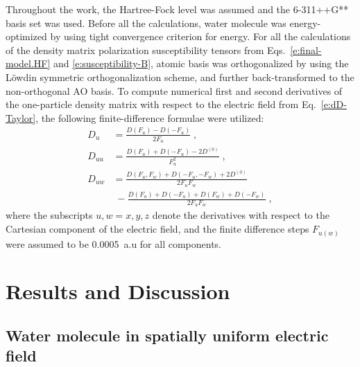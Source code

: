 \documentclass[aip,amsmath,amssymb,reprint,floatfix]{revtex4-1}
\begin{document}
%
Throughout the work, the Hartree\hyp{}Fock level\cite{Roothaan.RevModPhys.1951} was assumed 
and the 6-311++G** basis set\cite{Krishnan.Binkley.Seeger.Pople.JCP.1980}
was used. Before all the calculations, water molecule was energy\hyp{}optimized
by using tight convergence criterion for energy.
For all the calculations of the density matrix polarization susceptibility tensors
from Eqs.~\eqref{e:final-model.HF} and \eqref{e:susceptibility-B}, 
atomic basis was orthogonalized by using the L{\"o}wdin symmetric orthogonalization scheme,\cite{Mayer.IJQC.2002}
and further back\hyp{}transformed to the non\hyp{}orthogonal AO basis.
To compute numerical first and second derivatives of the one\hyp{}particle density matrix
with respect to the electric field from Eq.~\eqref{e:dD-Taylor}, 
the following finite\hyp{}difference formulae were utilized:
%
\begin{subequations}\label{e:ff}
  \begin{align}
    D_u    &= \frac{D(F_u) - D(-F_u)}{2F_u} \;,\\
    D_{uu} &= \frac{D(F_u) + D(-F_u) - 2D^{(0)}}{F_u^2} \;,\\
    D_{uw} &= \frac{D(F_u,F_w) + D(-F_u,-F_w) + 2D^{(0)}}{2F_uF_w} \nonumber \\ 
           & \; -\frac{D(F_u) + D(-F_u) + D(F_w) + D(-F_w)}{2F_uF_w} \;,
  \end{align}
\end{subequations}
%
where 
the subscripts $u,w=x,y,z$ denote the derivatives with respect 
to the Cartesian component of the electric field, and the finite difference
steps $F_{u(w)}$ were assumed to be 0.0005~a.u for all components. 

\section{\label{s:4}Results and Discussion}

\subsection{\label{ss:41}Water molecule in spatially uniform electric field}
\end{document}
